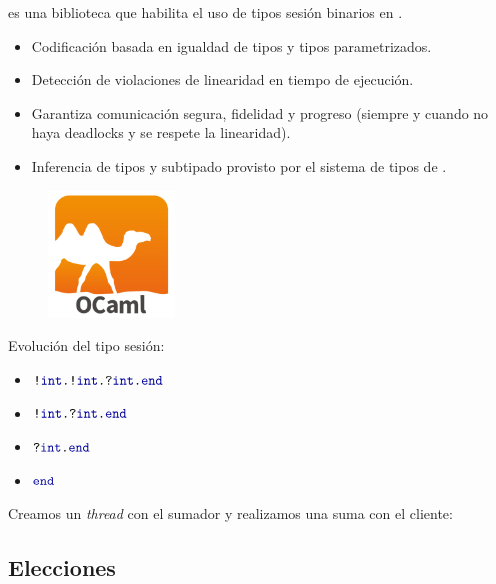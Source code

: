 \begin{frame}{\insertsubsection}
	\FuSe {} es una biblioteca que habilita el uso de tipos sesión binarios en
	\OCaml.
	\begin{itemize}
		\item Codificación basada en igualdad de tipos y tipos parametrizados.
		\item Detección de violaciones de linearidad en tiempo de ejecución.
		\item Garantiza comunicación segura, fidelidad y progreso (siempre y cuando no haya deadlocks y se respete la linearidad).
		\item Inferencia de tipos y subtipado provisto por el sistema de tipos de \OCaml.
	\end{itemize}
	\begin{figure}
		\centering
		\includegraphics[width=0.3\textwidth]{images/ocaml-logo.png}
	\end{figure}
\end{frame}

\begin{frame}{\insertsubsection}
	\SumClient
	Evolución del tipo sesión:
	\begin{itemize}
		\item {} $\Out\tint{ \Out\tint{ \In\tint\End } }$
		\item {} $\Out\tint{ \In\tint\End }$
		\item {} $\In\tint\End$
		\item {} $\End$
	\end{itemize}
\end{frame}

\begin{frame}{\insertsubsection}
	\SumServer
	Creamos un \emph{thread} con el sumador y realizamos una suma con el cliente:
	\SumExample
\end{frame}

\subsection{Elecciones}

